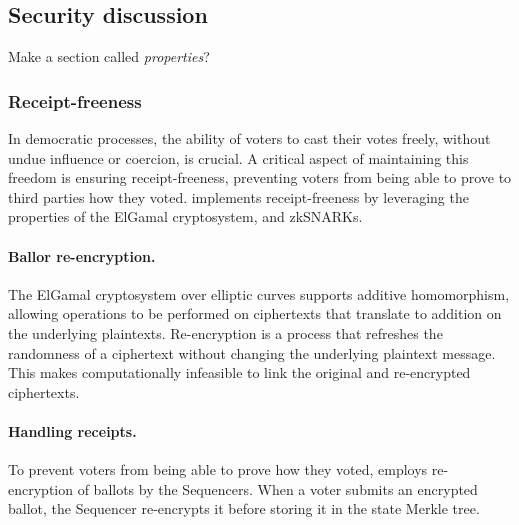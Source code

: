 



\subsection{Security discussion}
\label{sec:analysis:security}

Make a section called \textit{properties}?

\subsubsection{Receipt-freeness}

In democratic processes, the ability of voters to cast their votes freely, without undue influence or coercion, is crucial. A critical aspect of maintaining this freedom is ensuring receipt-freeness, preventing voters from being able to prove to third parties how they voted. \davinci implements receipt-freeness by leveraging the properties of the ElGamal cryptosystem, and zkSNARKs.

\paragraph{Ballor re-encryption.}

The ElGamal cryptosystem over elliptic curves supports additive homomorphism, allowing operations to be performed on ciphertexts that translate to addition on the underlying plaintexts. Re-encryption is a process that refreshes the randomness of a ciphertext without changing the underlying plaintext message. This makes computationally infeasible to link the original and re-encrypted ciphertexts.

\paragraph{Handling receipts.}

To prevent voters from being able to prove how they voted, \davinci employs re-encryption of ballots by the Sequencers. When a voter submits an encrypted ballot, the Sequencer re-encrypts it before storing it in the state Merkle tree.

